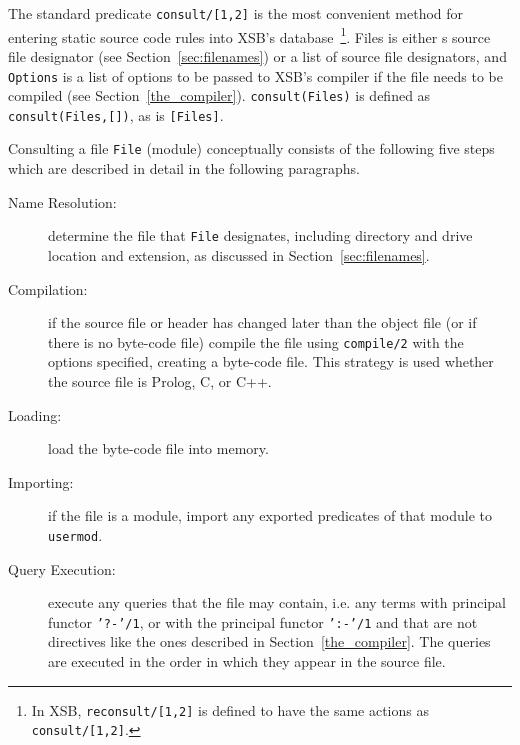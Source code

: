 \begin{description}
%
The standard predicate {\tt consult/[1,2]} is the most convenient
method for entering static source code rules into XSB's
database~\footnote{In XSB, {\tt reconsult/[1,2]} is defined to have
  the same actions as {\tt consult/[1,2]}.}.  Files is either s source
file designator (see Section~\ref{sec:filenames}) or a list of source
file designators, and {\tt Options} is a list of options to be passed
to XSB's compiler if the file needs to be compiled (see
Section~\ref{the_compiler}).  {\tt consult(Files)} is defined as {\tt
  consult(Files,[])}, as is {\tt [Files]}.

Consulting a file {\tt File} (module) conceptually consists of the
following five steps which are described in detail in the following
paragraphs.
\begin{description}
\item[Name Resolution:] determine the file that {\tt File} designates,
  including directory and drive location and extension, as discussed
  in Section~\ref{sec:filenames}.
\item[Compilation:] if the source file or header has changed later
  than the object file (or if there is no byte-code file) compile the
  file using {\tt compile/2} with the options specified, creating a
  byte-code file.  This strategy is used whether the source file is
  Prolog, C, or C++.
\item[Loading:] load the byte-code file into memory. 
\item[Importing:] if the file is a module, import any exported
	predicates of that module to {\tt usermod}.
\item[Query Execution:] execute any queries that the file may contain,
  i.e. any terms with principal functor {\tt '?-'/1}, or with the
  principal functor {\tt ':-'/1} and that are not directives like the
  ones described in Section~\ref{the_compiler}.  The queries are
  executed in the order in which they appear in the source file.
\end{description}


\end{description}
